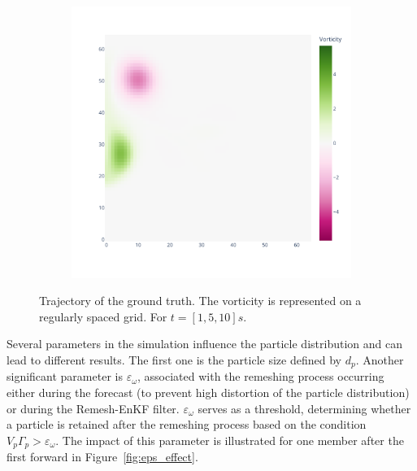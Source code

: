 \begin{figure}[htbp]
\begin{subfigure}{0.32\textwidth}
    \end{subfigure}
    \hfill
    \begin{subfigure}{0.32\textwidth}
        \includegraphics[width=\linewidth]{images/app2d/best_estimate_20.pdf}
    \end{subfigure}
    \caption{Trajectory of the ground truth. The vorticity is represented on a regularly spaced grid. For $t=[1, 5, 10]s.$}
    \label{fig:ref_trajectory}
\end{figure}
Several parameters in the simulation influence the particle distribution and can lead to different results. The first one is the particle size defined by $d_p$. Another significant parameter is $\varepsilon_\omega$, associated with the remeshing process occurring either during the forecast (to prevent high distortion of the particle distribution) or during the Remesh-EnKF filter. $\varepsilon_\omega$ serves as a threshold, determining whether a particle is retained after the remeshing process based on the condition $V_p \Gamma_p > \varepsilon_\omega$. The impact of this parameter is illustrated for one member after the first forward in Figure~\ref{fig:eps_effect}.

